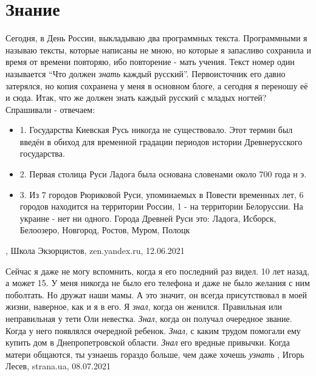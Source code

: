  
 
 
 
 
\chapter{Знание}
\label{sec:slova.znanie}

Сегодня, в День России, выкладываю два программных текста. Программными я
называю тексты, которые написаны не мною, но которые я запасливо сохранила и
время от времени повторяю, ибо повторение - мать учения. Текст номер один
называется \enquote{Что должен \emph{знать} каждый русский}. Первоисточник его давно
затерялся, но копия сохранена у меня в основном блоге, а сегодня я переношу её
и сюда. Итак, что же должен знать каждый русский с младых ногтей? Спрашивали -
отвечаем:
\begin{itemize}
  \item 1. Государства Киевская Русь никогда не существовало. Этот термин был введён в обиход для временной градации периодов истории Древнерусского государства.
  \item 2. Первая столица Руси Ладога была основана словенами около 700 года н э.
	\item 3. Из 7 городов Рюриковой Руси, упоминаемых в Повести временных лет, 6
					городов находится на территории России, 1 - на территории Белоруссии.
								На украине - нет ни одного. Города Древней Руси это: Ладога,
								Исборск, Белоозеро, Новгород, Ростов, Муром, Полоцк
\end{itemize}
, 
Школа Экзорцистов, zen.yandex.ru, 12.06.2021

Сейчас я даже не могу вспомнить, когда я его последний раз видел. 10 лет назад,
а может 15. У меня никогда не было его телефона и даже не было желания с ним
поболтать. Но дружат наши мамы. А это значит, он всегда присутствовал в моей
жизни, наверное, как и я в его. Я \emph{знал}, когда он женился. Правильная или
неправильная у тети Оли невестка. \emph{Знал}, когда он получал очередное звание.
Когда у него появлялся очередной ребенок. \emph{Знал}, с каким трудом помогали ему
купить дом в Днепропетровской области. \emph{Знал} его вредные привычки. Когда матери
общаются, ты узнаешь гораздо больше, чем даже хочешь \emph{узнать}
, 
Игорь Лесев, strana.ua, 08.07.2021
